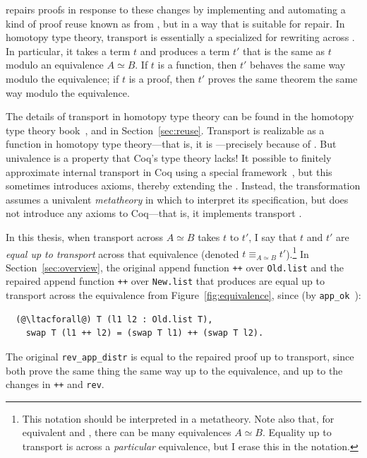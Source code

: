 \toolnamec repairs proofs in response to these changes by implementing and automating a kind of proof reuse known as  from ,
but in a way that is suitable for repair.
In homotopy type theory, transport is essentially a specialized  for rewriting across .
In particular, it takes a term $t$ and produces a term $t'$ that is the same as $t$ modulo an equivalence $A \simeq B$.
If $t$ is a function, then $t'$ behaves the same way modulo the equivalence;
if $t$ is a proof, then $t'$ proves the same theorem the same way modulo the equivalence.

The details of transport in homotopy type theory can be found in the homotopy type theory book~\cite{univalent2013homotopy}, and in Section~\ref{sec:reuse}.
Transport is realizable as a function in homotopy type theory---that is, it is ---precisely because of .
But univalence is a property that Coq's type theory  lacks!
It  possible to finitely approximate internal transport in Coq using a special framework~\cite{tabareau2017equivalences},
but this sometimes introduces axioms, thereby extending the .
Instead, the \toolnamec transformation assumes a univalent \textit{metatheory} in which to interpret its specification,
but does not introduce any axioms to Coq---that is, it implements transport .

In this thesis, when transport across $A \simeq B$ takes $t$ to $t'$,
I say that $t$ and $t'$ are \textit{equal up to transport}
across that equivalence (denoted $t \equiv_{A \simeq B} t'$).\footnote{This notation should be interpreted in a  metatheory.
Note also that, for equivalent \Aa and \B, there can be many equivalences $A \simeq B$.
Equality up to transport is across a \textit{particular} equivalence, but I erase this in the 
notation.}
In Section~\ref{sec:overview}, the original append function \lstinline{++} over \lstinline{Old.list}
and the repaired append function \lstinline{++} over \lstinline{New.list} that \toolnamec produces are
equal up to transport across the equivalence from Figure~\ref{fig:equivalence}, since (by \lstinline{app_ok}~\href{https://github.com/uwplse/pumpkin-pi/blob/v2.0.0/plugin/coq/Swap.v}{}):

\begin{lstlisting}
  (@\ltacforall@) T (l1 l2 : Old.list T),
    swap T (l1 ++ l2) = (swap T l1) ++ (swap T l2).
\end{lstlisting}
The original \lstinline{rev_app_distr} is equal to the repaired proof up to transport,
since both prove the same thing the same way up to the equivalence, and up to the changes in \lstinline{++}
and \lstinline{rev}.

